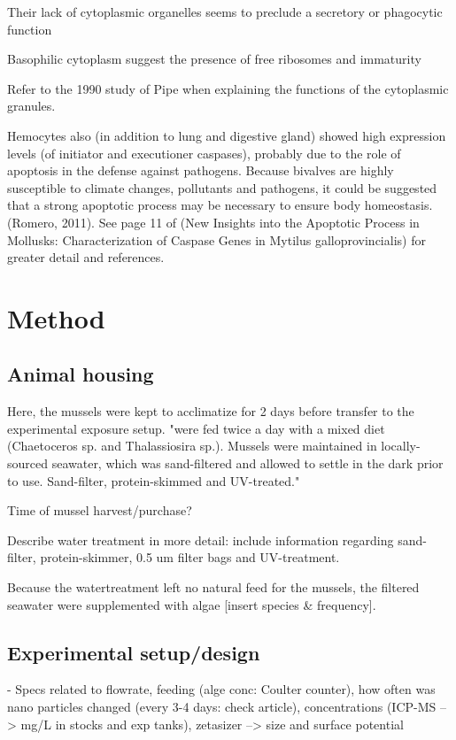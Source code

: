 Their lack of cytoplasmic organelles seems to preclude a secretory or phagocytic function

Basophilic cytoplasm suggest the presence of free ribosomes and immaturity

Refer to the 1990 study of Pipe when explaining the functions of the cytoplasmic granules.

Hemocytes also (in addition to lung and digestive gland) showed high expression levels (of initiator and executioner caspases), probably due to the role of apoptosis in the defense against pathogens. Because bivalves are highly susceptible to climate changes, pollutants and pathogens, it  could be suggested that a strong apoptotic process may be necessary to ensure body homeostasis. (Romero, 2011). See page 11 of (New Insights into the Apoptotic Process in Mollusks: Characterization of Caspase Genes in Mytilus galloprovincialis) for greater detail and references.



\section{Method}
\subsection{Animal housing}
Here, the mussels were kept to acclimatize for 2 days before transfer to the experimental exposure setup.
"were fed twice a day with a mixed diet (Chaetoceros sp. and Thalassiosira sp.). Mussels were maintained in locally-sourced seawater, which was sand-filtered and allowed to settle in the dark prior to use. Sand-filter, protein-skimmed and UV-treated."

Time of mussel harvest/purchase?

Describe water treatment in more detail: include information regarding sand-filter, protein-skimmer, 0.5 um filter bags and UV-treatment.

Because the watertreatment left no natural feed for the mussels, the filtered seawater were supplemented with algae [insert species \& frequency].


\subsection{Experimental setup/design}
- Specs related to flowrate, feeding (alge conc: Coulter counter), how often was nano particles changed (every 3-4 days: check article), concentrations (ICP-MS --> mg/L in stocks and exp tanks), zetasizer --> size and surface potential

